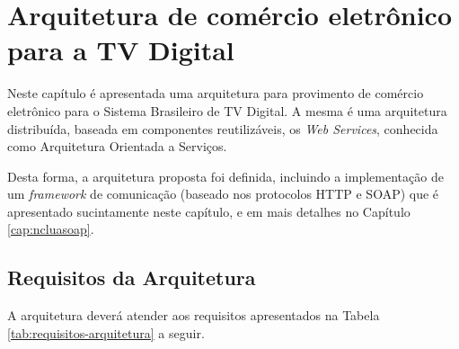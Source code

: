\chapter{Arquitetura de comércio eletrônico para a TV Digital} \label{cap:arquitetura-tcommerce}

Neste capítulo é apresentada uma arquitetura para provimento de comércio eletrônico
para o Sistema Brasileiro de TV Digital. A mesma é uma arquitetura distribuída, baseada em componentes
reutilizáveis, os \textit{Web Services}, conhecida como Arquitetura Orientada a Serviços.

\begin{comment}
Segundo \cite{sommerville2011soft}:

\begin{quote}
"sistemas grandes são sempre decompostos em sub-sistemas que fornecem algum conjunto de serviços relacionados.
Assim, o processo inicial de projeto consiste em identificar esses sub-sistemas e estabelecer um \textit{framework}
de controle e comunicação."
\end{quote}
\end{comment}

Desta forma, a arquitetura proposta foi definida, incluindo a implementação de um \textit{framework} de comunicação (baseado nos protocolos
HTTP e SOAP) que é apresentado sucintamente neste capítulo, e em mais detalhes no Capítulo \ref{cap:ncluasoap}.

\section{Requisitos da Arquitetura} \label{sec:req-arquitetura}

A arquitetura deverá atender aos requisitos apresentados na Tabela \ref{tab:requisitos-arquitetura} a seguir.

